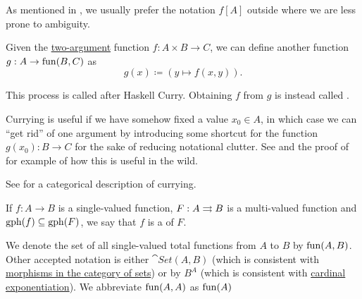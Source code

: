 \begin{definition}
\begin{thmenum}
    As mentioned in , we usually prefer the notation \( f[A] \) outside  where we are less prone to ambiguity.

     Given the \hyperref[def:multi_valued_function/arguments]{two-argument} function \( f: A \times B \to C \), we can define another function \( g: A \to \operatorname{fun}(B, C) \) as
    \begin{equation*}
      g(x) \coloneqq (y \mapsto f(x, y)).
    \end{equation*}

    This process is called  after Haskell Curry. Obtaining \( f \) from \( g \) is instead called .

    Currying is useful if we have somehow fixed a value \( x_0 \in A \), in which case we can \enquote{get rid} of one argument by introducing some shortcut for the function \( g(x_0): B \to C \) for the sake of reducing notational clutter. See  and the proof of  for example of how this is useful in the wild.

    See  for a categorical description of currying.

     If \( f: A \to B \) is a single-valued function, \( F: A \rightrightarrows B \) is a multi-valued function and \( \operatorname{gph}(f) \subseteq \operatorname{gph}(F) \), we say that \( f \) is a  of \( F \).

     We denote the set of all single-valued total functions from \( A \) to \( B \) by \( \operatorname{fun}(A, B) \). Other accepted notation is either \( \cat{Set}(A, B) \) (which is consistent with \hyperref[def:category_of_small_sets]{morphisms in the category of sets}) or by \( B^A \) (which is consistent with \hyperref[thm:cardinal_exponentiation_power_set]{cardinal exponentiation}). We abbreviate \( \operatorname{fun}(A, A) \) as \( \operatorname{fun}(A) \)
  \end{thmenum}
\end{definition}

